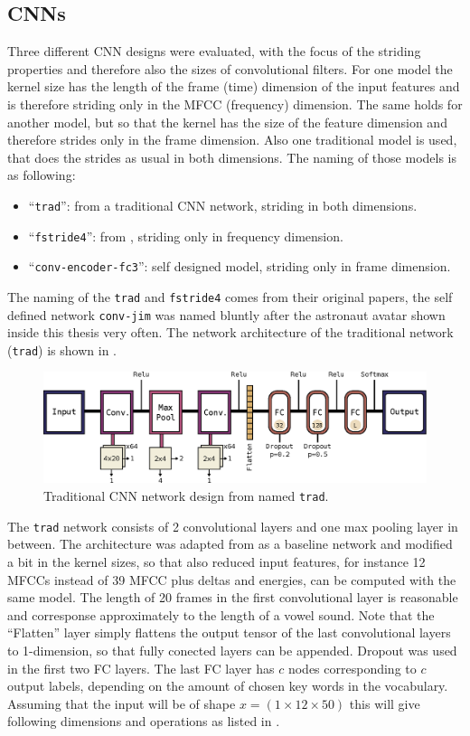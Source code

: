 \subsection{CNNs}\label{sec:nn_arch_cnn}
Three different CNN designs were evaluated, with the focus of the striding properties and therefore also the sizes of convolutional filters.
For one model the kernel size has the length of the frame (time) dimension of the input features and is therefore striding only in the MFCC (frequency) dimension.
The same holds for another model, but so that the kernel has the size of the feature dimension and therefore strides only in the frame dimension.
Also one traditional model is used, that does the strides as usual in both dimensions.
The naming of those models is as following:
\begin{itemize}
	\item \enquote{\texttt{trad}}: from \cite{Sainath2015} a traditional CNN network, striding in both dimensions.
	\item \enquote{\texttt{fstride4}}: from \cite{Sainath2015}, striding only in frequency dimension.
	\item \enquote{\texttt{conv-encoder-fc3}}: self designed model, striding only in frame dimension.
\end{itemize}
The naming of the \texttt{trad} and \texttt{fstride4} comes from their original papers, the self defined network \texttt{conv-jim} was named bluntly after the astronaut avatar shown inside this thesis very often.
The network architecture of the traditional network (\texttt{trad}) is shown in .
\begin{figure}[!ht]
  \centering
    \includegraphics[height=0.2\textwidth]{./4_nn/figs/nn_arch_cnn_trad.eps}
  \caption{Traditional CNN network design from \cite{Sainath2015} named \texttt{trad}.}
  \label{fig:nn_arch_cnn_trad}
\end{figure}
\FloatBarrier
\noindent
The \texttt{trad} network consists of 2 convolutional layers and one max pooling layer in between.
The architecture was adapted from \cite{Sainath2015} as a baseline network and modified a bit in the kernel sizes, so that also reduced input features, for instance 12 MFCCs instead of 39 MFCC plus deltas and energies, can be computed with the same model.
The length of 20 frames in the first convolutional layer is reasonable and corresponse approximately to the length of a vowel sound.
Note that the \enquote{Flatten} layer simply flattens the output tensor of the last convolutional layers to 1-dimension, so that fully conected layers can be appended.
Dropout was used in the first two FC layers.
The last FC layer has $c$ nodes corresponding to $c$ output labels, depending on the amount of chosen key words in the vocabulary.
Assuming that the input will be of shape $x = (1 \times 12 \times 50)$ this will give following dimensions and operations as listed in .


